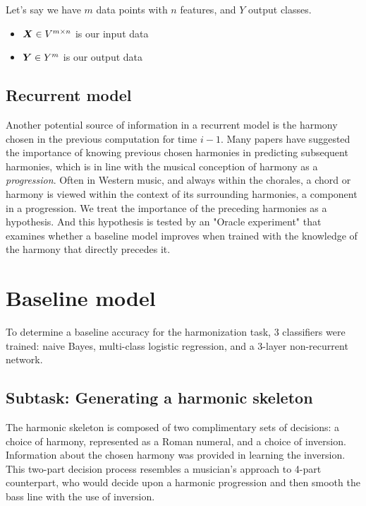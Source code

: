 \documentclass[12pt]{article}
\begin{document}
\noin Let's say we have $m$ data points with $n$ features, and $Y$ output classes.
\begin{itemize}
\item $\boldsymbol{X} \in V^{m \times n}$ is our input data
\item $\boldsymbol{Y} \in Y^m$ is our output data
\end{itemize}

\subsection{Recurrent model}

Another potential source of information in a recurrent model is the harmony chosen in the previous computation for time $i-1$. Many papers have suggested the importance of knowing previous chosen harmonies in predicting subsequent harmonies, which is in line with the musical conception of harmony as a \textit{progression}. Often in Western music, and always within the chorales, a chord or harmony is viewed within the context of its surrounding harmonies, a component in a progression. We treat the importance of the preceding harmonies as a hypothesis. And this hypothesis is tested by an "Oracle experiment" that examines whether a baseline model improves when trained with the knowledge of the harmony that directly precedes it.    

\section{Baseline model}

To determine a baseline accuracy for the harmonization task, 3 classifiers were trained: naive Bayes, multi-class logistic regression, and a 3-layer non-recurrent network.

\subsection{Subtask: Generating a harmonic skeleton} 

The harmonic skeleton is composed of two complimentary sets of decisions: a choice of harmony, represented as a Roman numeral, and a choice of inversion. Information about the chosen harmony was provided in learning the inversion. This two-part decision process resembles a musician's approach to 4-part counterpart, who would decide upon a harmonic progression and then smooth the bass line with the use of inversion. \\
\end{document}
